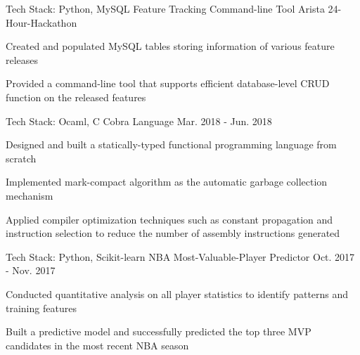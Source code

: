 

\begin{cventries}
\cventry
    {Tech Stack: Python, MySQL} %
    {Feature Tracking Command-line Tool} %
    {} %
    {Arista 24-Hour-Hackathon} %
    {
      \begin{cvitems} %
        \item {Created and populated MySQL tables storing information of various feature releases}
        \item {Provided a command-line tool that supports efficient database-level CRUD function on the released features}
      \end{cvitems}
    }

\cventry
    {Tech Stack: Ocaml, C} %
    {Cobra Language} %
    {} %
    {Mar. 2018 - Jun. 2018} %
    {
      \begin{cvitems} %
        \item {Designed and built a statically-typed functional programming language from scratch}
        \item {Implemented mark-compact algorithm as the automatic garbage collection mechanism}
        \item {Applied compiler optimization techniques such as constant propagation and instruction selection to reduce the number of assembly instructions generated}
      \end{cvitems}
    }
   
\cventry
    {Tech Stack: Python, Scikit-learn} %
    {NBA Most-Valuable-Player Predictor} %
    {} %
    {Oct. 2017 - Nov. 2017} %
    {
      \begin{cvitems} %
        \item {Conducted quantitative analysis on all player statistics to identify patterns and training features}
        \item {Built a predictive model and successfully predicted the top three MVP candidates in the most recent NBA season}
      \end{cvitems}
    }

\end{cventries}